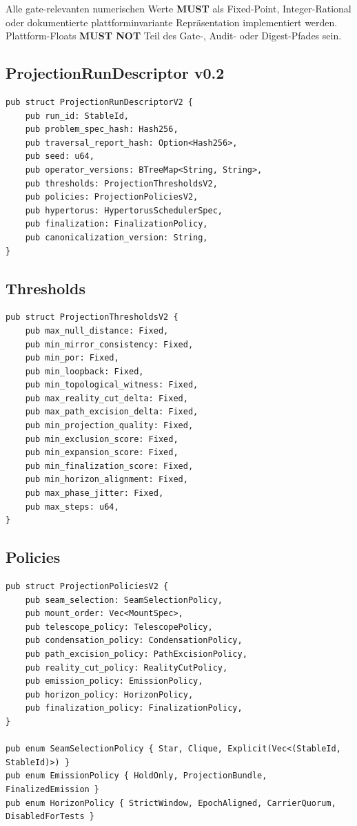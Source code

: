 \documentclass[11pt,a4paper]{article}
\newcommand{\MUST}{\textbf{MUST}}
\newcommand{\MUSTNOT}{\textbf{MUST NOT}}
\begin{document}
Alle gate-relevanten numerischen Werte \MUST{} als Fixed-Point, Integer-Rational oder dokumentierte plattforminvariante Repräsentation implementiert werden. Plattform-Floats \MUSTNOT{} Teil des Gate-, Audit- oder Digest-Pfades sein.

\subsection{ProjectionRunDescriptor v0.2}
\begin{lstlisting}
pub struct ProjectionRunDescriptorV2 {
    pub run_id: StableId,
    pub problem_spec_hash: Hash256,
    pub traversal_report_hash: Option<Hash256>,
    pub seed: u64,
    pub operator_versions: BTreeMap<String, String>,
    pub thresholds: ProjectionThresholdsV2,
    pub policies: ProjectionPoliciesV2,
    pub hypertorus: HypertorusSchedulerSpec,
    pub finalization: FinalizationPolicy,
    pub canonicalization_version: String,
}
\end{lstlisting}

\subsection{Thresholds}
\begin{lstlisting}
pub struct ProjectionThresholdsV2 {
    pub max_null_distance: Fixed,
    pub min_mirror_consistency: Fixed,
    pub min_por: Fixed,
    pub min_loopback: Fixed,
    pub min_topological_witness: Fixed,
    pub max_reality_cut_delta: Fixed,
    pub max_path_excision_delta: Fixed,
    pub min_projection_quality: Fixed,
    pub min_exclusion_score: Fixed,
    pub min_expansion_score: Fixed,
    pub min_finalization_score: Fixed,
    pub min_horizon_alignment: Fixed,
    pub max_phase_jitter: Fixed,
    pub max_steps: u64,
}
\end{lstlisting}

\subsection{Policies}
\begin{lstlisting}
pub struct ProjectionPoliciesV2 {
    pub seam_selection: SeamSelectionPolicy,
    pub mount_order: Vec<MountSpec>,
    pub telescope_policy: TelescopePolicy,
    pub condensation_policy: CondensationPolicy,
    pub path_excision_policy: PathExcisionPolicy,
    pub reality_cut_policy: RealityCutPolicy,
    pub emission_policy: EmissionPolicy,
    pub horizon_policy: HorizonPolicy,
    pub finalization_policy: FinalizationPolicy,
}

pub enum SeamSelectionPolicy { Star, Clique, Explicit(Vec<(StableId, StableId)>) }
pub enum EmissionPolicy { HoldOnly, ProjectionBundle, FinalizedEmission }
pub enum HorizonPolicy { StrictWindow, EpochAligned, CarrierQuorum, DisabledForTests }
\end{lstlisting}
\end{document}
